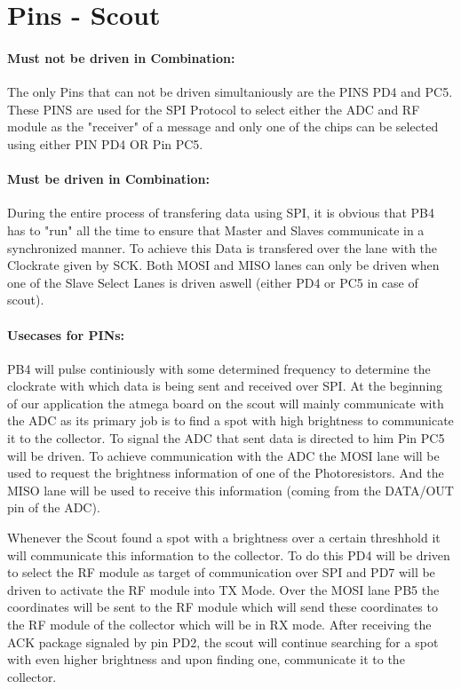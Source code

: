 \documentclass[12pt]{article}
\begin{document}
\lstset{language=C++}

\section*{Pins - Scout}

\paragraph{Must not be driven in Combination:}
The only Pins that can not be driven simultaniously are the PINS PD4 and PC5. These PINS are used for the SPI Protocol to select either the ADC and RF module as the "receiver" of a message and only one of the chips can be selected using either PIN PD4 OR Pin PC5.

\paragraph{Must be driven in Combination:}
During the entire process of transfering data using SPI, it is obvious that PB4 has to "run" all the time to ensure that Master and Slaves communicate in a  synchronized manner. To achieve this Data is transfered over the lane with the Clockrate given by SCK. Both MOSI and MISO lanes can only be driven when one of the Slave Select Lanes is driven aswell (either PD4 or PC5 in case of scout).

\paragraph{Usecases for PINs:} PB4 will pulse continiously with some determined frequency to determine the clockrate with which data is being sent and received over SPI. At the beginning of our application the atmega board on the scout will mainly communicate with the ADC as its primary job is to find a spot with high brightness to communicate it to the collector. To signal the ADC that sent data is directed to him Pin PC5 will be driven. To achieve communication with the ADC the MOSI lane will be used to request the brightness information of one of the Photoresistors. And the MISO lane will be used to receive this information (coming from the DATA/OUT pin of the ADC).

Whenever the Scout found a spot with a brightness over a certain threshhold it will communicate this information to the collector. To do this PD4 will be driven to select the RF module as target of communication over SPI and PD7 will be driven to activate the RF module into TX Mode. Over the MOSI lane PB5 the coordinates will be sent to the RF module which will send these coordinates to the RF module of the collector which will be in RX mode. After receiving the ACK package signaled by pin PD2, the scout will continue searching for a spot with even higher brightness and upon finding one, communicate it to the collector.
\end{document}
